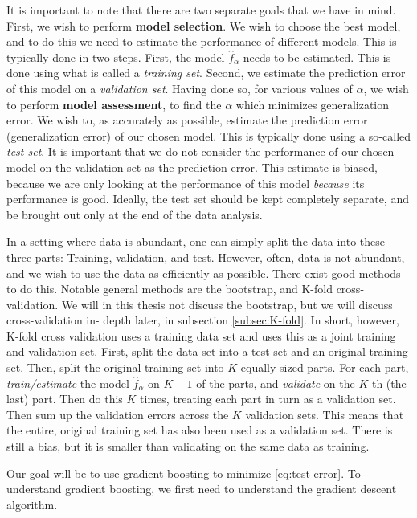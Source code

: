It is important to note that there are two separate goals that we have in mind.
First, we wish to perform \textbf{model selection}.
We wish to choose the best model, and to do this we need to estimate the performance of different models.
This is typically done in two steps.
First, the model $\hat{f}_\alpha$ needs to be estimated.
This is done using what is called a \textit{training set}.
Second, we estimate the prediction error of this model on a \textit{validation set}.
Having done so, for various values of $\alpha$, we wish to perform \textbf{model assessment}, to find the $\alpha$ which minimizes generalization error.
We wish to, as accurately as possible, estimate the prediction error (generalization error) of our chosen model.
This is typically done using a so-called \textit{test set}.
It is important that we do not consider the performance of our chosen model on the validation set as the prediction error.
This estimate is biased, because we are only looking at the performance of this model \textit{because} its performance is good.
Ideally, the test set should be kept completely separate, and be brought out only at the end of the data analysis.

In a setting where data is abundant, one can simply split the data into these three parts: Training, validation, and test.
However, often, data is not abundant, and we wish to use the data as efficiently as possible.
There exist good methods to do this.
Notable general methods are the bootstrap, and K-fold cross-validation.
We will in this thesis not discuss the bootstrap, but we will discuss cross-validation in- depth later, in subsection \ref{subsec:K-fold}.
In short, however, K-fold cross validation uses a training data set and uses this as a joint training and validation set.
First, split the data set into a test set and an original training set.
Then, split the original training set into $K$ equally sized parts.
For each part, \textit{train/estimate} the model $\hat{f}_\alpha$ on $K-1$ of the parts, and \textit{validate} on the $K$-th (the last) part.
Then do this $K$ times, treating each part in turn as a validation set.
Then sum up the validation errors across the $K$ validation sets.
This means that the entire, original training set has also been used as a validation set.
There is still a bias, but it is smaller than validating on the same data as training. 

Our goal will be to use gradient boosting to minimize \ref{eq:test-error}.
To understand gradient boosting, we first need to understand the gradient descent algorithm.

